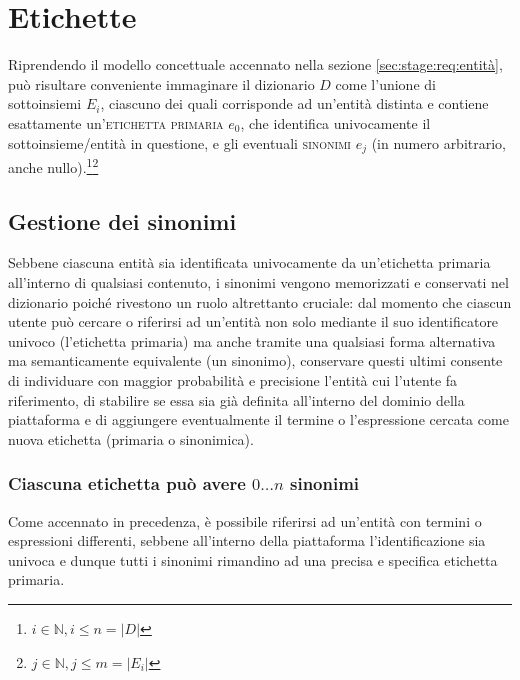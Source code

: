 \documentclass[10pt,a4paper,headinclude,footinclude,hidelinks]{scrreprt} %
\begin{document}
	\section{Etichette}
	\label{sec:stage:req:etichette}
	
	Riprendendo il modello concettuale accennato nella sezione \ref{sec:stage:req:entità}, può risultare conveniente immaginare il dizionario $D$ come l'unione di sottoinsiemi $E_i$, ciascuno dei quali corrisponde ad un'entità distinta e contiene esattamente un'\textsc{etichetta primaria} $e_0$, che identifica univocamente il sottoinsieme/entità in questione, e gli eventuali \textsc{sinonimi} $e_j$ (in numero arbitrario, anche nullo).\footnote{$i \in \mathbb{N}, i \leq n=\left|D\right|$}\footnote{$j \in \mathbb{N}, j \leq m=\left|E_i\right|$}


	\subsection{Gestione dei sinonimi}
	\label{sec:stage:req:etichette:sinonimi}
	Sebbene ciascuna entità sia identificata univocamente da un'etichetta primaria all'interno di qualsiasi contenuto, i sinonimi vengono memorizzati e conservati nel dizionario poiché rivestono un ruolo altrettanto cruciale: dal momento che ciascun utente può cercare o riferirsi ad un'entità non solo mediante il suo identificatore univoco (l'etichetta primaria) ma anche tramite una qualsiasi forma alternativa ma semanticamente equivalente (un sinonimo), conservare questi ultimi consente di individuare con maggior probabilità e precisione l'entità cui l'utente fa riferimento, di stabilire se essa sia già definita all'interno del dominio della piattaforma e di aggiungere eventualmente il termine o l'espressione cercata come nuova etichetta (primaria o sinonimica).

	\subsubsection{Ciascuna etichetta può avere $0\ldots n$ sinonimi}
	Come accennato in precedenza, è possibile riferirsi ad un'entità con termini o espressioni differenti, sebbene all'interno della piattaforma l'identificazione sia univoca e dunque tutti i sinonimi rimandino ad una precisa e specifica etichetta primaria.
	
\end{document}
